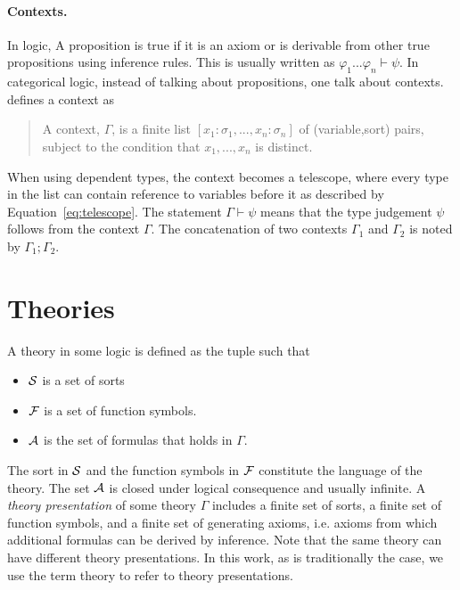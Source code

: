 \paragraph{Contexts.}
In logic, A proposition is true if it is an axiom or is derivable from other true propositions using inference rules. This is usually written as $\varphi_1 ... \varphi_n \vdash \psi$.  In categorical logic, instead of talking about propositions, one talk about contexts. \cite{handbook1993CategoricalLogic} defines a context as 
\begin{quote}
A context, $\Gamma$, is a finite list $[x_1 : \sigma_1, ... , x_n : \sigma_n]$ of (variable,sort) pairs, subject to the condition that $x_1, ... , x_n$ is distinct.  
\end{quote}
When using dependent types, the context becomes a telescope, where every type in the list can contain reference to variables before it as described by Equation~\ref{eq:telescope}. The statement $\Gamma \vdash \psi$ means that the type judgement $\psi$ follows from the context $\Gamma$. The concatenation of two contexts $\Gamma_1$ and $\Gamma_2$ is noted by $\Gamma_1 ; \Gamma_2$.  

\section{Theories}
\label{sec:background:theory}
A theory  in some logic is defined as the tuple \lstmath{($\sort$,$\fsyms$,$\axioms$)} such that 
\begin{itemize}
\item $\sort$ is a set of sorts 
\item $\fsyms$ is a set of function symbols. 
\item $\axioms$ is the set of formulas that holds in $\Gamma$. 
\end{itemize}
The sort in $\sort$ and the function symbols in $\fsyms$ constitute the language of the theory. 
The set $\axioms$ is closed under logical consequence and usually infinite. 
A \emph{theory presentation} of some theory $\Gamma$ includes a finite set of sorts, a finite set of function symbols, and a finite set of generating axioms, i.e. axioms from which additional formulas can be derived by inference. 
Note that the same theory can have different theory presentations. 
In this work, as is traditionally the case, we use the term theory to refer to theory presentations. 

